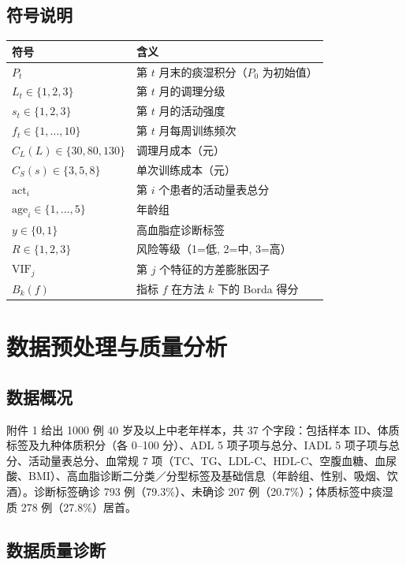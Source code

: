 \documentclass{MathorCupmodeling}
\begin{document}
\subsection{符号说明}

\begin{longtable}[]{@{}ll@{}}
\toprule\noalign{}
符号 & 含义 \\
\midrule\noalign{}
\endhead
\bottomrule\noalign{}
\endlastfoot
$P_t$ & 第 $t$ 月末的痰湿积分（$P_0$ 为初始值） \\
$L_t \in \{1,2,3\}$ & 第 $t$ 月的调理分级 \\
$s_t \in \{1,2,3\}$ & 第 $t$ 月的活动强度 \\
$f_t \in \{1,\dots,10\}$ & 第 $t$ 月每周训练频次 \\
$C_L(L) \in \{30, 80, 130\}$ & 调理月成本（元） \\
$C_S(s) \in \{3, 5, 8\}$ & 单次训练成本（元） \\
$\text{act}_i$ & 第 $i$ 个患者的活动量表总分 \\
$\text{age}_i \in \{1,\dots,5\}$ & 年龄组 \\
$y \in \{0, 1\}$ & 高血脂症诊断标签 \\
$R \in \{1, 2, 3\}$ & 风险等级（1=低, 2=中, 3=高） \\
$\text{VIF}_j$ & 第 $j$ 个特征的方差膨胀因子 \\
$B_k(f)$ & 指标 $f$ 在方法 $k$ 下的 Borda 得分 \\
\end{longtable}

\section{数据预处理与质量分析}\label{sec:data-cleaning}

\subsection{数据概况}

附件 1 给出 1000 例 40 岁及以上中老年样本，共 37 个字段：包括样本 ID、体质标签及九种体质积分（各 0--100 分）、ADL 5 项子项与总分、IADL 5 项子项与总分、活动量表总分、血常规 7 项（TC、TG、LDL-C、HDL-C、空腹血糖、血尿酸、BMI）、高血脂诊断二分类／分型标签及基础信息（年龄组、性别、吸烟、饮酒）。诊断标签确诊 793 例（79.3\%）、未确诊 207 例（20.7\%）；体质标签中痰湿质 278 例（27.8\%）居首。

\subsection{数据质量诊断}
\end{document}

